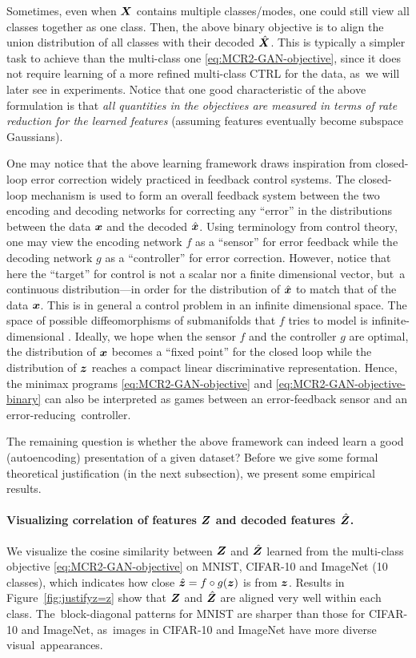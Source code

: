 \documentclass[../../book-main.tex]{subfiles}
\begin{document}
Sometimes, even when $\bm{X}$ contains multiple classes/modes, one could still view all classes together as one class. Then, the above binary objective is to align the union distribution of all classes with their decoded $\hat {\bm{X}}$. This is typically a simpler task to achieve than the multi-class one \eqref{eq:MCR2-GAN-objective}, since it does not require learning of a more refined multi-class CTRL for the data, as~we will later see in experiments. Notice that one good characteristic of the above formulation is that {\em all quantities in the objectives are measured in terms of rate reduction for the learned features} (assuming features eventually become subspace Gaussians). 

One may notice that the above learning framework draws inspiration from closed-loop error correction widely practiced in feedback control systems. The closed-loop mechanism is used to form an overall feedback system between the two encoding and decoding networks for correcting any  ``error'' in the distributions between the data $\bm{x}$ and the decoded $\hat {\bm{x}}$. Using terminology from control theory, one may view the encoding network $f$ as a ``sensor'' for error feedback while the decoding network $g$ as a ``controller'' for error correction. However, notice that here the ``target'' for control is not a scalar nor a finite dimensional vector, but~a continuous distribution---in order for the distribution of $\hat {\bm{x}}$ to match that of the data $\bm{x}$. This is in general a control problem in an infinite dimensional space. The space of possible diffeomorphisms of submanifolds that $f$ tries to model is infinite-dimensional \cite{Lee2002IntroductionTS}. Ideally, we hope when the sensor $f$ and the controller $g$ are optimal, the distribution of $\bm{x}$ becomes a ``fixed point'' for the closed loop while the distribution of $\bm{z}$ reaches a compact linear discriminative representation. Hence, the minimax programs \eqref{eq:MCR2-GAN-objective} and \eqref{eq:MCR2-GAN-objective-binary} can also be interpreted as games between an error-feedback sensor and an error-reducing~controller.

The remaining question is whether the above framework can indeed learn a good (autoencoding) presentation of a given dataset? Before we give some formal theoretical justification (in the next subsection), we present some empirical results. 

\paragraph{Visualizing correlation of features $\bm{Z}$ and decoded features $\hat {\bm{Z}}$.} We visualize the cosine similarity between $\bm{Z}$ and $\hat{\bm{Z}}$ learned from the multi-class objective \eqref{eq:MCR2-GAN-objective} on MNIST, CIFAR-10 and ImageNet (10 classes), which indicates how close $\hat{\bm{z}} = f\circ g(\bm{z})$ is from $\bm{z}$. Results in Figure~\ref{fig:justifyz=z} show that $\bm{Z}$ and $\hat{\bm{Z}}$ are aligned very well within each class. The~block-diagonal patterns for MNIST are sharper than those for CIFAR-10 and ImageNet, as~images in CIFAR-10 and ImageNet have more diverse visual~appearances.
\end{document}
